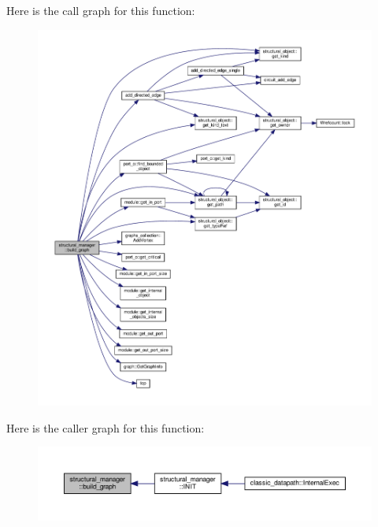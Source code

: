 Here is the call graph for this function\+:
\nopagebreak
\begin{figure}[H]
\begin{center}
\leavevmode
\includegraphics[width=350pt]{d7/d6b/classstructural__manager_a67650e28126957ac872f1f747956b1b5_cgraph}
\end{center}
\end{figure}
Here is the caller graph for this function\+:
\nopagebreak
\begin{figure}[H]
\begin{center}
\leavevmode
\includegraphics[width=350pt]{d7/d6b/classstructural__manager_a67650e28126957ac872f1f747956b1b5_icgraph}
\end{center}
\end{figure}
\mbox{\label{classstructural__manager_a84ce3ac584d5d9d216e49ff09abdc9e5}} 
